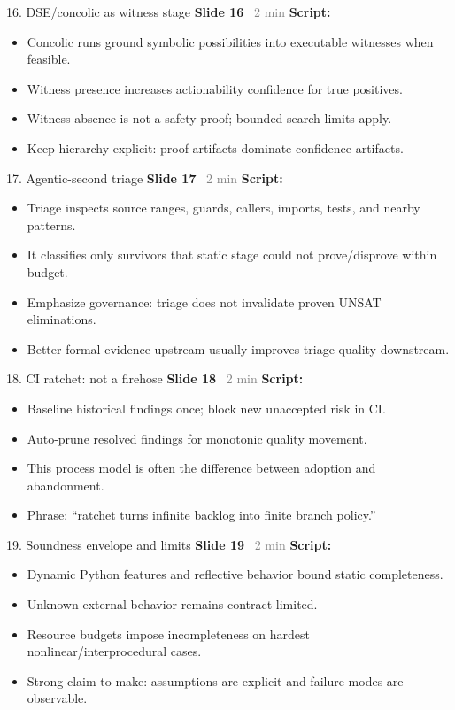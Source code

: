 \documentclass[aspectratio=169]{beamer}
\newcommand{\syncline}[2]{\textbf{#1} \hfill \textcolor{gray}{#2}}
\begin{document}
\begin{frame}{16. DSE/concolic as witness stage}
\syncline{Slide 16}{~2 min}
\textbf{Script:}
\begin{itemize}
  \item Concolic runs ground symbolic possibilities into executable witnesses when feasible.
  \item Witness presence increases actionability confidence for true positives.
  \item Witness absence is not a safety proof; bounded search limits apply.
  \item Keep hierarchy explicit: proof artifacts dominate confidence artifacts.
\end{itemize}
\end{frame}

\begin{frame}{17. Agentic-second triage}
\syncline{Slide 17}{~2 min}
\textbf{Script:}
\begin{itemize}
  \item Triage inspects source ranges, guards, callers, imports, tests, and nearby patterns.
  \item It classifies only survivors that static stage could not prove/disprove within budget.
  \item Emphasize governance: triage does not invalidate proven UNSAT eliminations.
  \item Better formal evidence upstream usually improves triage quality downstream.
\end{itemize}
\end{frame}

\begin{frame}{18. CI ratchet: not a firehose}
\syncline{Slide 18}{~2 min}
\textbf{Script:}
\begin{itemize}
  \item Baseline historical findings once; block new unaccepted risk in CI.
  \item Auto-prune resolved findings for monotonic quality movement.
  \item This process model is often the difference between adoption and abandonment.
  \item Phrase: ``ratchet turns infinite backlog into finite branch policy.''
\end{itemize}
\end{frame}

\begin{frame}{19. Soundness envelope and limits}
\syncline{Slide 19}{~2 min}
\textbf{Script:}
\begin{itemize}
  \item Dynamic Python features and reflective behavior bound static completeness.
  \item Unknown external behavior remains contract-limited.
  \item Resource budgets impose incompleteness on hardest nonlinear/interprocedural cases.
  \item Strong claim to make: assumptions are explicit and failure modes are observable.
\end{itemize}
\end{frame}
\end{document}

